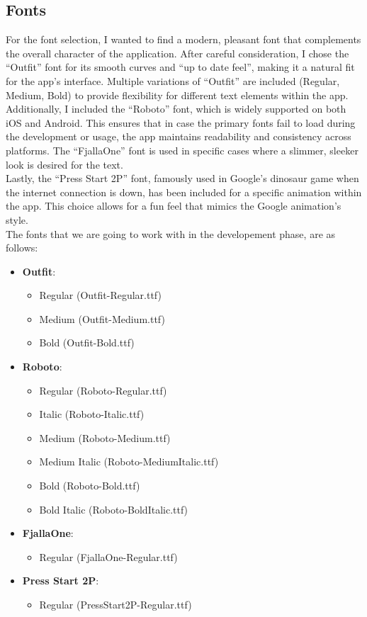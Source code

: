 \subsection{Fonts}
For the font selection, I wanted to find a modern, pleasant font that complements the overall character of the application. After careful consideration, I chose the ``Outfit'' font for its smooth curves and ``up to date feel'', making it a natural fit for the app’s interface. Multiple variations of ``Outfit'' are included (Regular, Medium, Bold) to provide flexibility for different text elements within the app.\vspace{5mm} \\
Additionally, I included the ``Roboto'' font, which is widely supported on both iOS and Android. This ensures that in case the primary fonts fail to load during the development or usage, the app maintains readability and consistency across platforms. The ``FjallaOne'' font is used in specific cases where a slimmer, sleeker look is desired for the text.\vspace{5mm} \\
Lastly, the ``Press Start 2P'' font, famously used in Google’s dinosaur game when the internet connection is down, has been included for a specific animation within the app. This choice allows for a fun feel that mimics the Google animation’s style.\vspace{5mm} \\
The fonts that we are going to work with in the developement phase, are as follows:
\begin{itemize}
    \item \textbf{Outfit}:
    \begin{itemize}
        \item Regular (Outfit-Regular.ttf)
        \item Medium (Outfit-Medium.ttf)
        \item Bold (Outfit-Bold.ttf)
    \end{itemize}
    \item \textbf{Roboto}:
    \begin{itemize}
        \item Regular (Roboto-Regular.ttf)
        \item Italic (Roboto-Italic.ttf)
        \item Medium (Roboto-Medium.ttf)
        \item Medium Italic (Roboto-MediumItalic.ttf)
        \item Bold (Roboto-Bold.ttf)
        \item Bold Italic (Roboto-BoldItalic.ttf)
    \end{itemize}
    \item \textbf{FjallaOne}:
\begin{itemize} \item Regular (FjallaOne-Regular.ttf) \end{itemize}
    \item \textbf{Press Start 2P}:
\begin{itemize} \item Regular (PressStart2P-Regular.ttf) \end{itemize}
\end{itemize}

